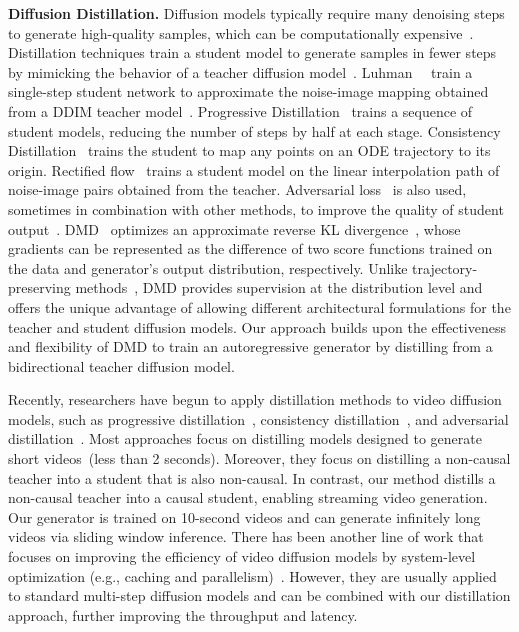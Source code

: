 \noindent\textbf{Diffusion Distillation.} Diffusion models typically require many denoising steps to generate high-quality samples, which can be computationally expensive~\cite{ho2020denoising,song2020denoising}. 
Distillation techniques train a student model to generate samples in fewer steps by mimicking the behavior of a teacher diffusion model~\cite{salimans2022progressive,meng2023distillation,song2023consistency,yin2024onestep,xu2023ufogen,sauer2025adversarial,luhman2021knowledge,kang2024distilling,ren2024hyper}. 
Luhman~\etal~\cite{luhman2021knowledge} train a single-step student network to approximate the noise-image mapping obtained from a DDIM teacher model~\cite{song2020denoising}. Progressive Distillation~\cite{salimans2022progressive} trains a sequence of student models, reducing the number of steps by half at each stage. Consistency Distillation~\cite{song2023consistency,luo2023latent,kim2023consistency,song2024improved,heek2024multistep} trains the student to map any points on an ODE trajectory to its origin. Rectified flow~\cite{liu2022flow,liu2023instaflow,esser2024scaling} trains a student model on the linear interpolation path of noise-image pairs obtained from the teacher. Adversarial loss~\cite{goodfellow2020generative} is also used, sometimes in combination with other methods, to improve the quality of student output~\cite{sauer2025adversarial,lin2024sdxl,yin2024improved,kang2024distilling,xu2023ufogen}.
DMD~\cite{yin2024onestep,yin2024improved} optimizes an approximate reverse KL divergence~\cite{wang2023prolificdreamer,luo2023diff,franceschi2023unifying,yi2023monoflow}, whose gradients can be represented as the difference of two score functions trained on the data and generator's output distribution, respectively. 
Unlike trajectory-preserving methods~\cite{salimans2022progressive,kim2023consistency,liu2023instaflow}, DMD provides supervision at the distribution level and offers the unique advantage of allowing different architectural formulations for the teacher and student diffusion models. 
Our approach builds upon the effectiveness and flexibility of DMD to train an autoregressive generator by distilling from a bidirectional teacher diffusion model.


Recently, researchers have begun to apply distillation methods to video diffusion models, such as progressive distillation~\cite{lin2024animatediff}, consistency distillation~\cite{wang2023videolcm,wang2024animatelcm,mao2024osv, li2024t2v}, and adversarial distillation~\cite{mao2024osv,zhang2024sf}. 
Most approaches focus on distilling models designed to generate short videos~(less than 2 seconds).
Moreover, they focus on distilling a non-causal teacher into a student that is also non-causal. 
In contrast, our method distills a non-causal teacher into a causal student, enabling streaming video generation. 
Our generator is trained on 10-second videos and can generate infinitely long videos via sliding window inference.
There has been another line of work that focuses on improving the efficiency of video diffusion models by system-level optimization (e.g., caching and parallelism)~\cite{zhang2024cross,liu2024faster,zhao2024real,zou2024accelerating}. 
However, they are usually applied to standard multi-step diffusion models and can be combined with our distillation approach, further improving the throughput and latency.
